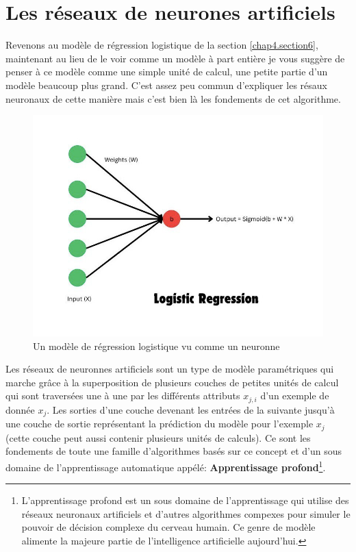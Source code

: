 \section{Les réseaux de neurones artificiels}
\label{chap4.section7}
Revenons au modèle de régression logistique de la section \ref{chap4.section6}, maintenant au lieu de le voir comme un modèle à part entière je vous suggère de penser à ce modèle comme une simple unité de calcul, une petite partie d'un modèle beaucoup plus grand. C'est assez peu commun d'expliquer les résaux neuronaux de cette manière mais c'est bien là les fondements de cet algorithme.

\begin{figure}
    \centering
    \includegraphics[width=0.75\linewidth]{images/logitReg2.png}
    \caption{Un modèle de régression logistique vu comme un neuronne}
    \label{fig:fig9}
\end{figure}

Les réseaux de neuronnes artificiels sont un type de modèle paramétriques qui marche grâce à la superposition de plusieurs couches de petites unités de calcul qui sont traversées une à une par les différents attributs \(x_{j,i}\) d'un exemple de donnée \(x_j\). Les sorties d'une couche devenant les entrées de la suivante jusqu'à une couche de sortie représentant la prédiction du modèle pour l'exemple \(x_j\) (cette couche peut aussi contenir plusieurs unités de calculs). Ce sont les fondements de toute une famille d'algorithmes basés sur ce concept et d'un sous domaine de l'apprentissage automatique appélé: \textbf{Apprentissage profond}\footnote{L'apprentissage profond est un sous domaine de l'apprentissage qui utilise des réseaux neuronaux artificiels et d'autres algorithmes compexes pour simuler le pouvoir de décision complexe du cerveau humain. Ce genre de modèle alimente la majeure partie de l’intelligence artificielle aujourd’hui.}.

